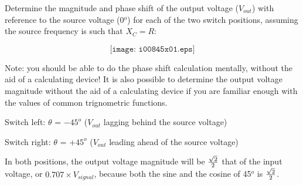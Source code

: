 

Determine the magnitude and phase shift of the output voltage ($V_{out}$) with reference to the source voltage (0$^{o}$) for each of the two switch positions, assuming the source frequency is such that $X_C = R$:

$$\texttt{[image: i00845x01.eps]}$$

Note: you should be able to do the phase shift calculation mentally, without the aid of a calculating device!  It is also possible to determine the output voltage magnitude without the aid of a calculating device if you are familiar enough with the values of common trignometric functions.







Switch left: $\theta$ = $-45^{o}$ ($V_{out}$ lagging behind the source voltage)

\vskip 10pt

Switch right: $\theta$ = $+45^{o}$ ($V_{out}$ leading ahead of the source voltage)

\vskip 10pt

In both positions, the output voltage magnitude will be $\sqrt{2} \over 2$ that of the input voltage, or $0.707 \times V_{signal}$, because both the sine and the cosine of 45$^{o}$ is $\sqrt{2} \over 2$.  










